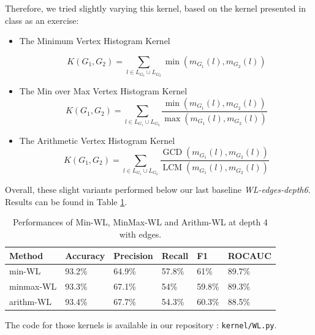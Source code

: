 \documentclass{IEEEtran}
\begin{document}
Therefore, we tried slightly varying this kernel, based on the kernel presented in class as an exercise:

\begin{itemize}
    \item The Minimum Vertex Histogram Kernel

          \begin{equation*}
              K(G_1, G_2) = \sum_{l \in L_{G_1} \cup L_{G_2}} \operatorname*{min}(m_{G_1}(l), m_{G_2}(l))
          \end{equation*}

    \item The Min over Max Vertex Histogram Kernel
          \begin{equation*}
              K(G_1, G_2) = \sum_{l \in L_{G_1} \cup L_{G_2}} \frac{\operatorname*{min}(m_{G_1}(l), m_{G_2}(l))}{\operatorname*{max}(m_{G_1}(l), m_{G_2}(l))}
          \end{equation*}
    \item The Arithmetic Vertex Histogram Kernel
          \begin{equation*}
              K(G_1, G_2) = \sum_{l \in L_{G_1} \cup L_{G_2}} \frac{\operatorname*{GCD}(m_{G_1}(l), m_{G_2}(l))}{\operatorname*{LCM}(m_{G_1}(l), m_{G_2}(l))}
          \end{equation*}
\end{itemize}

Overall, these slight variants performed below our last baseline \emph{WL-edges-depth6}.
Results can be found in Table \ref{tab:method_comparison_depth4}.
\begin{table}[h]
    \centering
    \begin{tabular}{l|llll|l}
        Method    & Accuracy & Precision & Recall & F1     & ROCAUC \\
        \hline
        min-WL    & 93.2\%   & 64.9\%    & 57.8\% & 61\%   & 89.7\% \\
        minmax-WL & 93.3\%   & 67.1\%    & 54\%   & 59.8\% & 89.3\% \\
        arithm-WL & 93.4\%   & 67.7\%    & 54.3\% & 60.3\% & 88.5\% \\
    \end{tabular}
    \caption{Performances of Min-WL, MinMax-WL and Arithm-WL at depth 4 with edges.}
    \label{tab:method_comparison_depth4}
\end{table}

The code for those kernels is available in our repository : \texttt{kernel/WL.py}.
\end{document}
